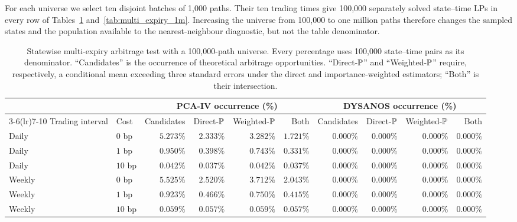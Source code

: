 \begin{enumerate}
{For each universe we select ten disjoint batches of 1,000 paths. Their ten
trading times give 100,000 separately solved state--time LPs in every row
of Tables~\ref{tab:multi_expiry_100k} and~\ref{tab:multi_expiry_1m}. Increasing
the universe from 100,000 to one million paths therefore changes the sampled
states and the population available to the nearest-neighbour diagnostic, but
not the table denominator.}
\end{enumerate}






\begin{table}[H]
\centering
\scriptsize
\setlength{\tabcolsep}{2pt}
\begin{tabular}{llrrrrrrrr}
\toprule
 & & \multicolumn{4}{c}{PCA-IV occurrence (\%)}
       & \multicolumn{4}{c}{DYSANOS occurrence (\%)}\\
\cmidrule(lr){3-6}\cmidrule(lr){7-10}
Trading interval & Cost & Candidates & Direct-$\P$ & Weighted-$\P$ & Both
                         & Candidates & Direct-$\P$ & Weighted-$\P$ & Both\\
\midrule
Daily  & $0$ bp  & $5.273\%$ & $2.333\%$ & $3.282\%$ & $1.721\%$ & $0.000\%$ & $0.000\%$ & $0.000\%$ & $0.000\%$\\
Daily  & $1$ bp  & $0.950\%$ & $0.398\%$ & $0.743\%$ & $0.331\%$ & $0.000\%$ & $0.000\%$ & $0.000\%$ & $0.000\%$\\
Daily  & $10$ bp & $0.042\%$ & $0.037\%$ & $0.042\%$ & $0.037\%$ & $0.000\%$ & $0.000\%$ & $0.000\%$ & $0.000\%$\\
Weekly & $0$ bp  & $5.525\%$ & $2.520\%$ & $3.712\%$ & $2.043\%$ & $0.000\%$ & $0.000\%$ & $0.000\%$ & $0.000\%$\\
Weekly & $1$ bp  & $0.923\%$ & $0.466\%$ & $0.750\%$ & $0.415\%$ & $0.000\%$ & $0.000\%$ & $0.000\%$ & $0.000\%$\\
Weekly & $10$ bp & $0.059\%$ & $0.057\%$ & $0.059\%$ & $0.057\%$ & $0.000\%$ & $0.000\%$ & $0.000\%$ & $0.000\%$\\
\bottomrule
\end{tabular}
\caption{Statewise multi-expiry arbitrage test with a 100,000-path universe.
Every percentage uses 100,000 state--time pairs as its denominator.
``Candidates'' is the occurrence of theoretical arbitrage opportunities. ``Direct-$\P$'' and
``Weighted-$\P$'' require, respectively, a conditional mean exceeding three
standard errors under the direct and importance-weighted estimators; ``Both''
is their intersection.}
\label{tab:multi_expiry_100k}
\end{table}

